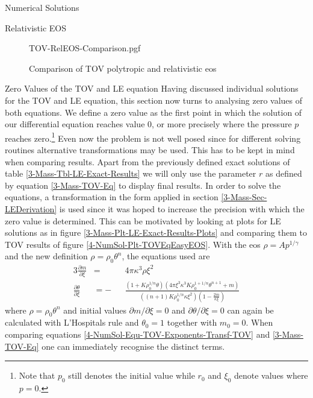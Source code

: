 \begin{section}{Numerical Solutions}
\begin{subsection}{Relativistic EOS}
\begin{figure}
	\centering
	{TOV-RelEOS-Comparison.pgf}
	\caption[Comparison of TOV polytropic and relativistic EOS]{Comparison of TOV polytropic and relativistic \acs{eos}}
	\label{4-NumSol-Plt-RelEOS-TOV-Comparison}
\end{figure}
\end{subsection}
%
%
\begin{subsection}{Zero Values of the TOV and LE equation}
\label{4-NumSol-Sec-TOV-Exponents}
Having discussed individual solutions for the \ac{TOV} and \ac{LE} equation, this section now turns to analysing zero values of both equations.
We define a zero value as the first point in which the solution of our differential equation reaches value $0$, or more precisely where the pressure $p$ reaches zero.\footnote{Note that $p_0$ still denotes the initial value while $r_0$ and $\xi_0$ denote values where $p=0$.}
Even now the problem is not well posed since for different solving routines alternative transformations may be used.
This has to be kept in mind when comparing results. 
Apart from the previously defined exact solutions of table \ref{3-Mass-Tbl-LE-Exact-Results} we will only use the parameter $r$ as defined by equation \eqref{3-Mass-TOV-Eq} to display final results.
In order to solve the equations, a transformation in the form applied in section \ref{3-Mass-Sec-LEDerivation} is used since it was hoped to increase the precision with which the zero value is determined.
This can be motivated by looking at plots for \ac{LE} solutions as in figure \ref{3-Mass-Plt-LE-Exact-Results-Plots} and comparing them to \ac{TOV} results of figure \ref{4-NumSol-Plt-TOVEqEasyEOS}.
With the \ac{eos} $\rho=Ap^{1/\gamma}$ and the new definition $\rho=\rho_0\theta^n$, the equations used are 
\begin{alignat}{3}
	\frac{\partial m}{\partial\xi} &= &&4\pi\kappa^3\rho\xi^2\\
	\frac{\partial\theta}{\partial\xi} &= -&&\frac{\left(1+K\rho_0^{1/n}\theta\right)\left(4\pi\xi^3\kappa^3K\rho_0^{1+1/n}\theta^{n+1}+ m\right)}{\left((n+1)K\rho_0^{1/n}\kappa\xi^2\right)\left(1-\frac{2 m}{\kappa\xi}\right)}
	\label{4-NumSol-Equ-TOV-Exponents-Transf-TOV}
\end{alignat}
where $\rho=\rho_0\theta^n$ and initial values $\partial m/\partial\xi=0$ and $\partial\theta/\partial\xi=0$ can again be calculated with L'Hospitals rule and $\theta_0=1$ together with $ m_0=0$.
When comparing equations \eqref{4-NumSol-Equ-TOV-Exponents-Transf-TOV} and \eqref{3-Mass-TOV-Eq} one can immediately recognise the distinct terms.

\end{subsection}
\end{section}
